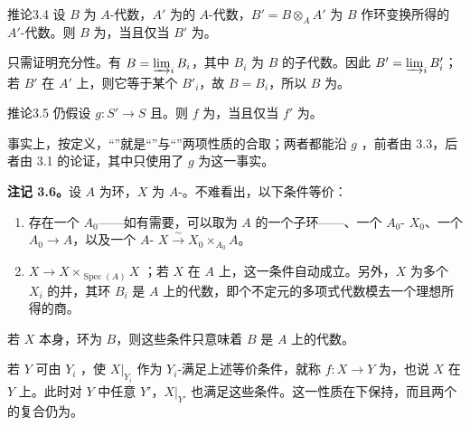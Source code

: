 \begin{SGAresult}{推论}{3.4}
设 $B$ 为 $A$-代数，$A'$ 为的 $A$-代数，$B'=B\otimes_A A'$ 为 $B$ 作环变换所得的 $A'$-代数。则 $B$ 为，当且仅当 $B'$ 为。
\end{SGAresult}
只需证明充分性。有 $B=\varinjlim_i B_i$，其中 $B_i$ 为 $B$ 的子代数。因此 $B'=\varinjlim_i B'_i$；若 $B'$ 在 $A'$ 上，则它等于某个 $B'_i$，故 $B=B_i$，所以 $B$ 为。

\begin{SGAresult}{推论}{3.5}
仍假设 $g:S'\to S$ 且。则 $f$ 为，当且仅当 $f'$ 为。
\end{SGAresult}

事实上，按定义，“”就是“”与“”两项性质的合取；两者都能沿 $g$ ，前者由 3.3，后者由 3.1 的论证，其中只使用了 $g$ 为这一事实。

\textbf{注记 3.6。}设 $A$ 为环，$X$ 为 $A$-。不难看出，以下条件等价：
\begin{enumerate}[label=(\roman*)]
\item 存在一个 $A_0$——如有需要，可以取为 $A$ 的一个子环——、一个 $A_0$- $X_0$、一个 $A_0\to A$，以及一个 $A$- $X\xrightarrow{\sim}X_0\times_{A_0}A$。
\item {} $X\to X\times_{\operatorname{Spec}(A)}X$ ；若 $X$ 在 $A$ 上，这一条件自动成立。另外，$X$ 为多个 $X_i$ 的并，其环 $B_i$ 是 $A$ 上的代数，即个不定元的多项式代数模去一个理想所得的商。
\end{enumerate}
若 $X$ 本身，环为 $B$，则这些条件只意味着 $B$ 是 $A$ 上的代数。

若 $Y$ 可由 $Y_i$ ，使 $X|_{Y_i}$ 作为 $Y_i$-满足上述等价条件，就称 $f:X\to Y$ 为，也说 $X$ 在 $Y$ 上。此时对 $Y$ 中任意 $Y'$，$X|_{Y'}$ 也满足这些条件。这一性质在下保持，而且两个的复合仍为。

